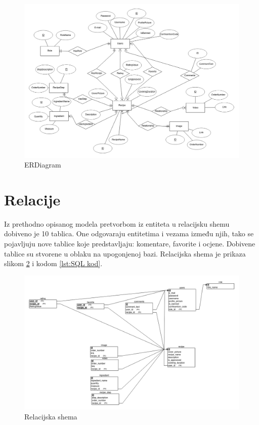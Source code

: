 \documentclass[times, utf8, zavrsni]{fer}
\begin{document}
\begin{figure}
      \includegraphics[width=\textwidth]{ERDiagram.png}
      \caption{ERDiagram}
      \label{fig:ER Diagram}
\end{figure}

\section{Relacije}
Iz prethodno opisanog modela pretvorbom iz entiteta u relacijsku shemu dobiveno je 10
tablica. One odgovaraju
entitetima i vezama između njih, tako se pojavljuju nove tablice koje predstavljaju:
komentare, favorite i ocjene. Dobivene tablice su stvorene u oblaku na upogonjenoj bazi.
Relacijska shema je prikaza slikom \ref{fig:Relacijska shema} i kodom \ref{lst:SQL kod}.

\begin{figure}
      \includegraphics[width=\textwidth]{RelationalSchema.png}
      \caption{Relacijska shema}
      \label{fig:Relacijska shema}
\end{figure}
\end{document}
